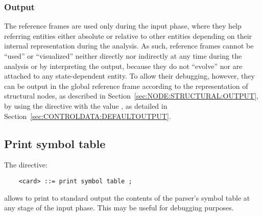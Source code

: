 \subsubsection{Output}
The reference frames are used only during the input phase, 
where they help referring entities either absolute 
or relative to other entities depending on their internal representation
during the analysis.
As such, reference frames cannot be ``used'' or ``visualized'' neither 
directly nor indirectly at any time during the analysis or by interpreting
the output, because they do not ``evolve'' nor are attached
to any state-dependent entity.
To allow their debugging, however, they can be output in the global
reference frame according to the representation of structural nodes,
as described in Section~\ref{sec:NODE:STRUCTURAL:OUTPUT}, 
by using the  directive 
with the value , as detailed
in Section~\ref{sec:CONTROLDATA:DEFAULTOUTPUT}.



\subsection{Print symbol table}
The  directive:
\begin{verbatim}
    <card> ::= print symbol table ;
\end{verbatim}
allows to print to standard output the contents of the parser's symbol
table at any stage of the input phase.
This may be useful for debugging purposes.



